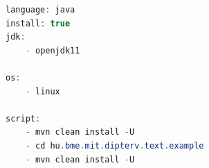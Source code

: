 \begin{lstlisting}[language=java, frame=single, float=ht!, caption={Travis CI-hoz tartozó .travis.yml script.},captionpos=b]
language: java
install: true
jdk:
    - openjdk11

os:
    - linux

script:
    - mvn clean install -U
    - cd hu.bme.mit.dipterv.text.example
    - mvn clean install -U
\end{lstlisting}
